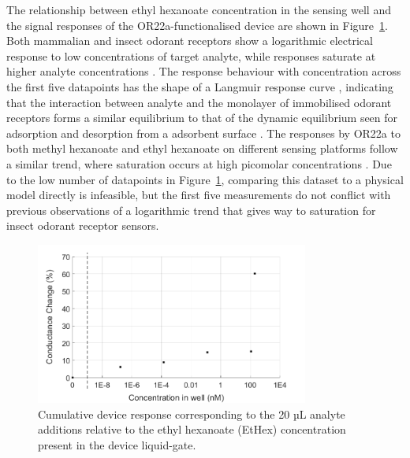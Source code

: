 \documentclass[
  a4paper,
]{scrbook}
\begin{document}
The relationship between ethyl hexanoate concentration in the sensing
well and the signal responses of the OR22a-functionalised device are
shown in Figure~\ref{fig-EtHex-responses}. Both mammalian and insect
odorant receptors show a logarithmic electrical response to low
concentrations of target analyte, while responses saturate at higher
analyte concentrations
\autocite{Persaud1982,Jin2012,Kwon2015,Yoo2022,Khadka2019,Murugathas2020,Cheema2021}.
The response behaviour with concentration across the first five
datapoints has the shape of a Langmuir response curve
\autocite{Jin2012,Kwon2015,Yoo2022}, indicating that the interaction
between analyte and the monolayer of immobilised odorant receptors forms
a similar equilibrium to that of the dynamic equilibrium seen for
adsorption and desorption from a adsorbent surface
\autocite{Ayawei2017}. The responses by OR22a to both methyl hexanoate
and ethyl hexanoate on different sensing platforms follow a similar
trend, where saturation occurs at high picomolar concentrations
\autocite{Murugathas2020,Cheema2021}. Due to the low number of
datapoints in Figure~\ref{fig-EtHex-responses}, comparing this dataset
to a physical model directly is infeasible, but the first five
measurements do not conflict with previous observations of a logarithmic
trend that gives way to saturation for insect odorant receptor sensors.

\begin{figure}

{\centering \includegraphics[width=0.8\textwidth,height=\textheight]{figures/ch7/concentrations.png}

}

\caption[Cumulative device response corresponding to the 20 µL analyte
additions relative to the ethyl hexanoate (EtHex) concentration present
in the device liquid-gate.]{\label{fig-EtHex-responses}Cumulative device
response corresponding to the 20 µL analyte additions relative to the
ethyl hexanoate (EtHex) concentration present in the device
liquid-gate.}

\end{figure}
\end{document}
